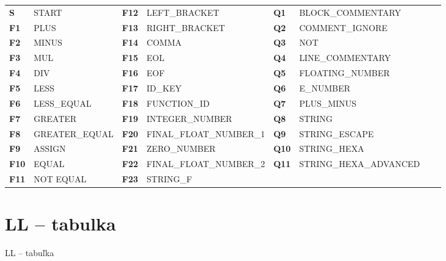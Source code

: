 \documentclass[a4paper, 11pt]{article}
\begin{document}
\begin{table}[!ht]
\begin{tabular}{llllllll}
\textbf{S}   & START            & \textbf{F12} & LEFT\_BRACKET           &   \textbf{Q1}  & BLOCK\_COMMENTARY      \\
\textbf{F1}  & PLUS             & \textbf{F13} & RIGHT\_BRACKET          &   \textbf{Q2}  & COMMENT\_IGNORE        \\
\textbf{F2}  & MINUS            & \textbf{F14} & COMMA                   &   \textbf{Q3}  & NOT                    \\
\textbf{F3}  & MUL              & \textbf{F15} & EOL                     &   \textbf{Q4}  & LINE\_COMMENTARY       \\
\textbf{F4}  & DIV              & \textbf{F16} & EOF                     &   \textbf{Q5}  & FLOATING\_NUMBER       \\
\textbf{F5}  & LESS             & \textbf{F17} & ID\_KEY                 &   \textbf{Q6}  & E\_NUMBER              \\
\textbf{F6}  & LESS\_EQUAL      & \textbf{F18} & FUNCTION\_ID            &   \textbf{Q7}  & PLUS\_MINUS            \\
\textbf{F7}  & GREATER          & \textbf{F19} & INTEGER\_NUMBER         &   \textbf{Q8}  & STRING                 \\
\textbf{F8}  & GREATER\_EQUAL   & \textbf{F20} & FINAL\_FLOAT\_NUMBER\_1 &   \textbf{Q9}  & STRING\_ESCAPE         \\
\textbf{F9}  & ASSIGN           & \textbf{F21} & ZERO\_NUMBER            &   \textbf{Q10} & STRING\_HEXA           \\
\textbf{F10} & EQUAL            & \textbf{F22} & FINAL\_FLOAT\_NUMBER\_2 &   \textbf{Q11} & STRING\_HEXA\_ADVANCED \\
\textbf{F11} & NOT EQUAL        & \textbf{F23} & STRING\_F               &                &                       
\end{tabular}
\end{table}

\section{LL -- tabulka}
\begin{table}[ht]
\centering
\caption{LL -- tabuľka}
\end{table}
\end{document}
